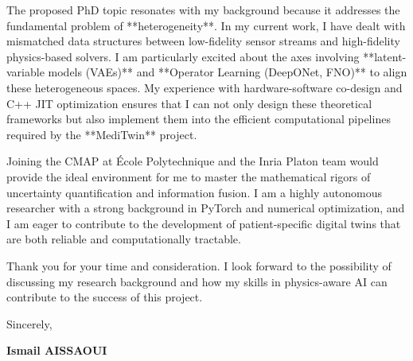 \documentclass[a4paper,11pt]{article}
\begin{document}
The proposed PhD topic resonates with my background because it addresses the fundamental problem of **heterogeneity**. In my current work, I have dealt with mismatched data structures between low-fidelity sensor streams and high-fidelity physics-based solvers. I am particularly excited about the axes involving **latent-variable models (VAEs)** and **Operator Learning (DeepONet, FNO)** to align these heterogeneous spaces. My experience with hardware-software co-design and C++ JIT optimization ensures that I can not only design these theoretical frameworks but also implement them into the efficient computational pipelines required by the **MediTwin** project.

Joining the CMAP at École Polytechnique and the Inria Platon team would provide the ideal environment for me to master the mathematical rigors of uncertainty quantification and information fusion. I am a highly autonomous researcher with a strong background in PyTorch and numerical optimization, and I am eager to contribute to the development of patient-specific digital twins that are both reliable and computationally tractable.

Thank you for your time and consideration. I look forward to the possibility of discussing my research background and how my skills in physics-aware AI can contribute to the success of this project.

\bigskip

Sincerely,

\bigskip

\textbf{Ismail AISSAOUI}
\end{document}
